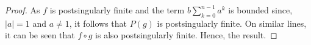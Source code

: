\documentclass[a4paper,12pt]{amsart}
\numberwithin{equation}{section}
\newtheorem{theorem}{Theorem}[section]
\begin{document}
\begin{proof}
		As $f$ is postsingularly finite and the term $ b \sum_{k=0}^{n-1}a^k$ is bounded since, $|a|=1$ and $a\neq 1$, it follows that $P(g)$ is postsingularly finite. On similar lines, it can be seen that $f \circ g$ is also postsingularly finite. Hence, the result.
	\end{proof}
	
\end{document}
